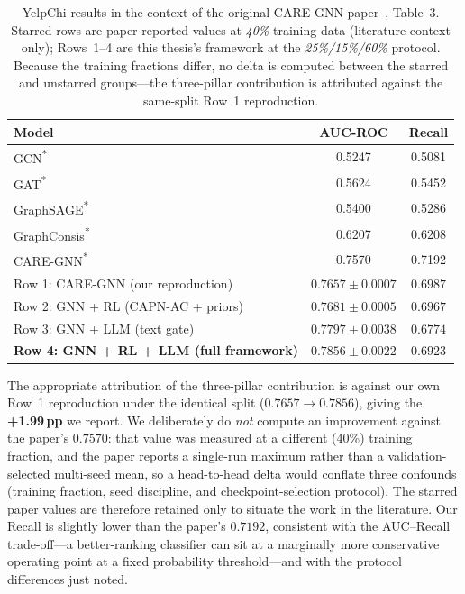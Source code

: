 \begin{table}[h!]
\centering
\begin{tabular}{lcc}
\toprule
\textbf{Model} & \textbf{AUC-ROC} & \textbf{Recall} \\
\midrule
GCN\textsuperscript{*}                     & 0.5247 & 0.5081 \\
GAT\textsuperscript{*}                     & 0.5624 & 0.5452 \\
GraphSAGE\textsuperscript{*}               & 0.5400 & 0.5286 \\
GraphConsis\textsuperscript{*}             & 0.6207 & 0.6208 \\
CARE-GNN\textsuperscript{*}                & 0.7570 & 0.7192 \\
\midrule
Row 1: CARE-GNN (our reproduction)                & $0.7657 \pm 0.0007$ & $0.6987$ \\
Row 2: GNN + RL (CAPN-AC + priors)                & $0.7681 \pm 0.0005$ & $0.6967$ \\
Row 3: GNN + LLM (text gate)                      & $0.7797 \pm 0.0038$ & $0.6774$ \\
\textbf{Row 4: GNN + RL + LLM (full framework)}   & $\mathbf{0.7856 \pm 0.0022}$ & $0.6923$ \\
\bottomrule
\end{tabular}
\caption{YelpChi results in the context of the original CARE-GNN paper~\cite{dou2020enhancing}, Table~3. Starred rows are paper-reported values at \emph{40\%} training data (literature context only); Rows~1--4 are this thesis's framework at the \emph{25\%/15\%/60\%} protocol. Because the training fractions differ, no delta is computed between the starred and unstarred groups---the three-pillar contribution is attributed against the same-split Row~1 reproduction.}
\label{tab:main-framework-paper-compare}
\end{table}

\noindent
The appropriate attribution of the three-pillar contribution is against our own Row~1 reproduction under the identical split ($0.7657 \to 0.7856$), giving the \textbf{+1.99\,pp} we report. We deliberately do \emph{not} compute an improvement against the paper's $0.7570$: that value was measured at a different (40\%) training fraction, and the paper reports a single-run maximum rather than a validation-selected multi-seed mean, so a head-to-head delta would conflate three confounds (training fraction, seed discipline, and checkpoint-selection protocol). The starred paper values are therefore retained only to situate the work in the literature. Our Recall is slightly lower than the paper's $0.7192$, consistent with the AUC--Recall trade-off---a better-ranking classifier can sit at a marginally more conservative operating point at a fixed probability threshold---and with the protocol differences just noted.

